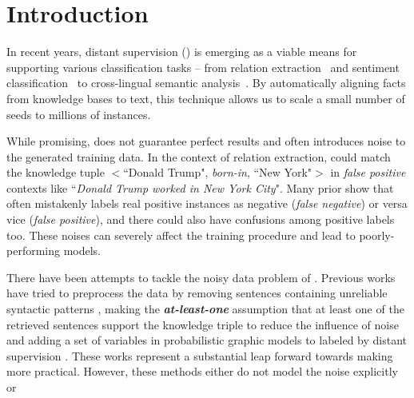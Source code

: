 \section{Introduction}

In recent years, distant supervision (\DS) is emerging as a viable means for supporting various classification tasks -- from relation extraction~\cite{mintz2009distant} and sentiment classification~\cite{go2009twitter} to cross-lingual semantic
analysis~\cite{fang2016learning}. By automatically aligning
facts from knowledge bases to text, this technique allows us to scale a small number of seeds to millions of instances.



While promising, \DS does not guarantee perfect results and often introduces noise to the
generated training data. In the context of relation extraction, \DS could match the knowledge tuple $<$``Donald Trump",
\emph{born-in}, ``New York"$>$  in \emph{false positive} contexts like ``\emph{Donald Trump worked in New York City}".
Many prior  show that \DS often mistakenly labels real positive instances as negative (\emph{false negative}) or
versa vice (\emph{false positive}), and there could also have confusions among positive labels too. These noises can
severely affect the training
procedure and lead to poorly-performing models.

There have been attempts to tackle the noisy data problem of \DS. Previous works have tried to preprocess the data by removing sentences containing unreliable syntactic patterns \cite{takamatsu2012reducing}, making the \textbf{\textit{at-least-one}} assumption that at least one of the retrieved sentences support the knowledge triple to reduce the influence of noise \cite{riedel2010modeling} and adding a set of variables in probabilistic graphic models to  labeled by distant supervision \cite{hoffmann2011knowledge,surdeanu2012multi}. These works represent a substantial leap forward towards making \DS more practical. However, these methods either do not model the noise explicitly or 

